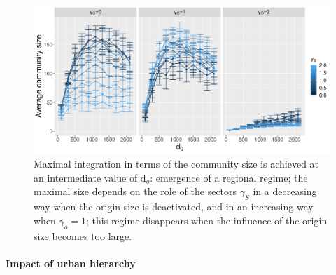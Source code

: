 \documentclass[10pt,letterpaper]{article}
\begin{document}
\begin{figure}
    \includegraphics[width=\textwidth]{figures/Fig6.png}
	\caption{Maximal integration in terms of the community size is achieved at an intermediate value of d$_o$: emergence of a regional regime; the maximal size depends on the role of the sectors $\gamma_S$ in a decreasing way when the origin size is deactivated, and in an increasing way when $\gamma_o=1$; this regime disappears when the influence of the origin size becomes too large.\label{fig:fig6}}
\end{figure}


\paragraph{Impact of urban hierarchy}
\end{document}
